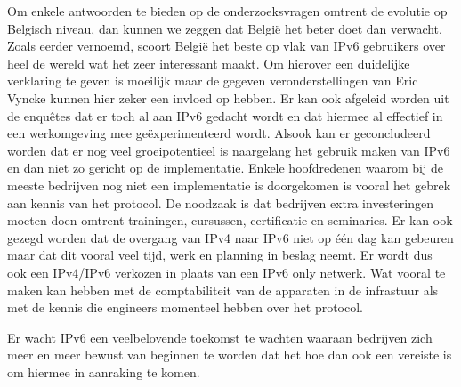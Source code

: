 Om enkele antwoorden te bieden op de onderzoeksvragen omtrent de evolutie op Belgisch niveau, dan kunnen we zeggen dat België het beter doet dan verwacht. Zoals eerder vernoemd, scoort België het beste op vlak van IPv6 gebruikers over heel de wereld wat het zeer interessant maakt. Om hierover een duidelijke verklaring te geven is moeilijk maar de gegeven veronderstellingen van Eric Vyncke kunnen hier zeker een invloed op hebben. Er kan ook afgeleid worden uit de enquêtes dat er toch al aan IPv6 gedacht wordt en dat hiermee al effectief in een werkomgeving mee geëxperimenteerd wordt. Alsook kan er geconcludeerd worden dat er nog veel groeipotentieel is naargelang het gebruik maken van IPv6 en dan niet zo gericht op de implementatie. Enkele hoofdredenen waarom bij de meeste bedrijven nog niet een implementatie is doorgekomen is vooral het gebrek aan kennis van het protocol. De noodzaak is dat bedrijven extra investeringen moeten doen omtrent trainingen, cursussen, certificatie en seminaries. Er kan ook gezegd worden dat de overgang van IPv4 naar IPv6 niet op één dag kan gebeuren maar dat dit vooral veel tijd, werk en planning in beslag neemt. Er wordt dus ook een IPv4/IPv6 verkozen in plaats van een IPv6 only netwerk. Wat vooral te maken kan hebben met de comptabiliteit van de apparaten in de infrastuur als met de kennis die engineers momenteel hebben over het protocol.

Er wacht IPv6 een veelbelovende toekomst te wachten waaraan bedrijven zich meer en meer bewust van beginnen te worden dat het hoe dan ook een vereiste is om hiermee in aanraking te komen. 
